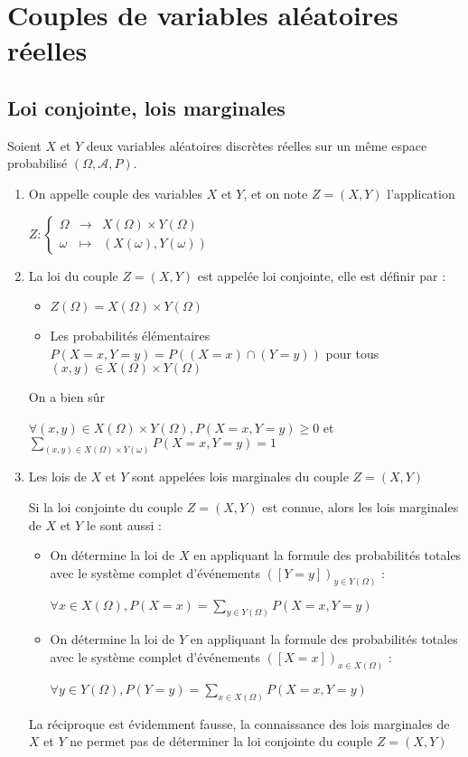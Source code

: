 \documentclass[a4paper,12pt]{book}
\newcommand{\Def}[2]{\begin{tcolorbox}[sharp corners, colback=white,colframe=blue!90!black!75, title=Définition : #1]#2\end{tcolorbox}}
\begin{document}
\section{Couples de variables aléatoires réelles}
\subsection{Loi conjointe, lois marginales}
\Def{}{Soient $X$ et $Y$ deux variables aléatoires discrètes réelles sur un même espace probabilisé $(\Omega, \mathcal{A},P)$.\begin{enumerate}
\item On appelle couple des variables $X$ et $Y$, et on note $Z=(X,Y)$ l'application \par\begin{center}$Z:\left\{\begin{array}{rcl}\Omega & \to & X(\Omega)\times Y(\Omega) \\ \omega & \mapsto & (X(\omega), Y(\omega)) \end{array}\right.$\end{center}
\item La loi du couple $Z=(X,Y)$ est appelée loi conjointe, elle est définir par :\begin{itemize}
    \item $Z(\Omega)=X(\Omega)\times Y(\Omega)$
    \item Les probabilités élémentaires $P(X=x, Y=y)=P((X=x)\cap(Y=y))$ pour tous $(x,y)\in X(\Omega)\times Y(\Omega)$
\end{itemize} On a bien sûr \par\begin{center}$\forall (x,y)\in X(\Omega)\times Y(\Omega), P(X=x,Y=y)\geq 0$ et $\sum\limits_{(x,y)\in X(\Omega)\times Y(\omega)}P(X=x,Y=y)=1$\end{center}
\item Les lois de $X$ et $Y$ sont appelées lois marginales du couple $Z=(X,Y)$
\par Si la loi conjointe du couple $Z=(X,Y)$ est connue, alors les lois marginales de $X$ et $Y$ le sont aussi :\begin{itemize}
    \item On détermine la loi de $X$ en appliquant la formule des probabilités totales avec le système complet d'événements $([Y=y])_{y\in Y(\Omega)}$ :
    \par\begin{center}$\forall x\in X(\Omega), P(X=x)=\sum\limits_{y\in Y(\Omega)}P(X=x, Y=y)$\end{center}
    \item On détermine la loi de $Y$ en appliquant la formule des probabilités totales avec le système complet d'événements $([X=x])_{x\in X(\Omega)}$ :
    \par\begin{center}$\forall y\in Y(\Omega), P(Y=y)=\sum\limits_{x\in X(\Omega)}P(X=x, Y=y)$\end{center}
\end{itemize} La réciproque est évidemment fausse, la connaissance des lois marginales de $X$ et $Y$ ne permet pas de déterminer la loi conjointe du couple $Z=(X,Y)$
\end{enumerate}}
\end{document}
